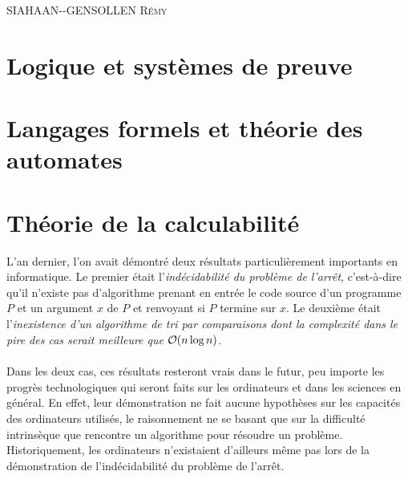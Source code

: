 \documentclass[a4paper,french,bookmarks]{book}
\begin{document}
    \hfill{\textsc{SIAHAAN-{}-GENSOLLEN Rémy}}
    
    \pagestyle{intro}
    

    \dominitoc\nomtcrule 
    {\sffamily\tableofcontents}\mtcaddchapter\pagestyle{toc}
    
    
    
    \pagestyle{plain}
    
    \chapter{Logique et systèmes de preuve}
    
    
    
    \chapter{Langages formels et théorie des automates}
    
    
    
    \chapter{Théorie de la calculabilité}
    
    L'an dernier, l'on avait démontré deux résultats particulièrement importants en informatique. Le premier était l'\emph{indécidabilité du problème de l'arrêt}, c'est-à-dire qu'il n'existe pas d'algorithme prenant en entrée le code source d'un programme $P$ et un argument $x$ de $P$ et renvoyant si $P$ termine sur $x$. Le deuxième était l'\emph{inexistence d'un algorithme de tri par comparaisons dont la complexité dans le pire des cas serait meilleure que $\O{}{n\log n}$}.\medskip
    
    Dans les deux cas, ces résultats resteront vrais dans le futur, peu importe les progrès technologiques qui seront faits sur les ordinateurs et dans les sciences en général. En effet, leur démonstration ne fait aucune hypothèses sur les capacités des ordinateurs utilisés, le raisonnement ne se basant que sur la difficulté intrinsèque que rencontre un algorithme pour résoudre un problème. Historiquement, les ordinateurs n'existaient d'ailleurs même pas lors de la démonstration de l'indécidabilité du problème de l'arrêt.\medskip
    
\end{document}
